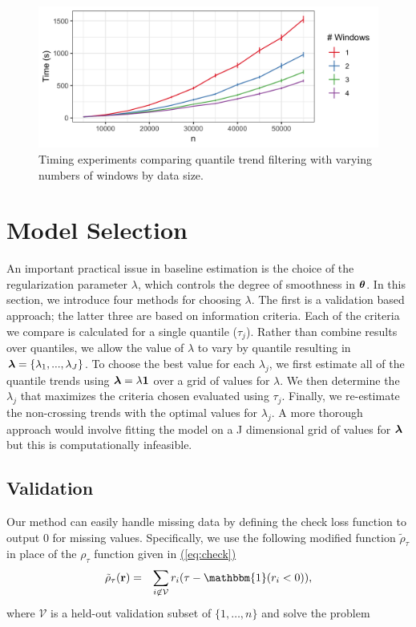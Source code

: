 \documentclass[aoas]{imsart}
\newcommand{\Eqn}[1]{\hyperref[eq:#1]{{\rm (\ref*{eq:#1})}}} %
\newcommand{\Eqn}[1]{{(\ref{eq:#1})}} %
\newcommand{\One}{\mathbbm{1}}
\newcommand{\V}[1]{{\bm{\mathbf{\MakeLowercase{#1}}}}} %
\newcommand{\VE}[2]{\MakeLowercase{#1}_{#2}} %
\begin{document}
\begin{figure}[!t]
	\centering
	\includegraphics[width = 0.7\linewidth]{Figures/Fig_timing_experiment.png}
	\caption{Timing experiments comparing quantile trend filtering with varying numbers of windows by data size.}
	\label{fig:timing}
\end{figure}



\section{Model Selection}
\label{sec:lambda_choice}

An important practical issue in baseline estimation is the choice of the regularization parameter $\lambda$, which controls the degree of smoothness in $\V{\theta}$. In this section, we introduce four methods for choosing $\lambda$. The first is a validation based approach; the latter three are based on information criteria. Each of the criteria we compare is calculated for a single quantile ($\tau_j$). Rather than combine results over quantiles, we allow the value of $\lambda$ to vary by quantile resulting in $\V{\lambda} = \{\lambda_1, ..., \lambda_J\}$. To choose the best value for each $\lambda_j$, we first estimate all of the quantile trends using $\V{\lambda} = \lambda\mathbf{1}$ over a grid of values for $\lambda$. We then determine the $\lambda_j$ that maximizes the criteria chosen evaluated using $\tau_j$. Finally, we re-estimate the non-crossing trends with the optimal values for $\lambda_j$. A more thorough approach would involve fitting the model on a J dimensional grid of values for $\V{\lambda}$ but this is computationally infeasible.      

\subsection{Validation}
Our method can easily handle missing data by defining the check loss function to output 0 for missing values. %
Specifically, we use the following modified function $\tilde{\rho}_\tau$ in place of the $\rho_\tau$ function given in \Eqn{check}
\begin{eqnarray}
\label{eq:modcheck}
\tilde{\rho}_{\tau}(\V{r}) & = & \sum_{i \not\in \mathcal{V}} \VE{r}{i}(\tau-\One(\VE{r}{i}<0)),
\end{eqnarray}
where $\mathcal{V}$ is a held-out validation subset of $\{1, \ldots, n\}$ and solve the problem
\end{document}
